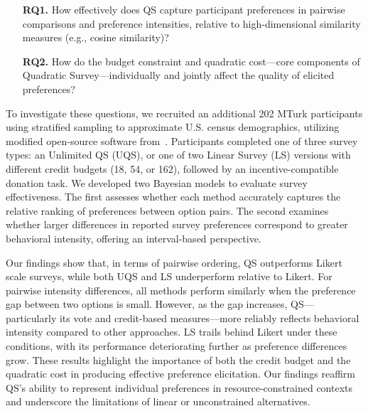 \begin{itemize}
    \item [\textbf{RQ1.}] How effectively does QS capture participant preferences in pairwise comparisons and preference intensities, relative to high-dimensional similarity measures (e.g., cosine similarity)?
    \item [\textbf{RQ2.}] How do the budget constraint and quadratic cost---core components of Quadratic Survey---individually and jointly affect the quality of elicited preferences?
\end{itemize}


To investigate these questions, we recruited an additional 202 MTurk participants using stratified sampling to approximate U.S. census demographics, utilizing modified open-source software from~\citet{chengCanShowWhat2021}. Participants completed one of three survey types: an Unlimited QS (UQS), or one of two Linear Survey (LS) versions with different credit budgets (18, 54, or 162), followed by an incentive-compatible donation task. We developed two Bayesian models to evaluate survey effectiveness. The first assesses whether each method accurately captures the relative ranking of preferences between option pairs. The second examines whether larger differences in reported survey preferences correspond to greater behavioral intensity, offering an interval-based perspective.

Our findings show that, in terms of pairwise ordering, QS outperforms Likert scale surveys, while both UQS and LS underperform relative to Likert. For pairwise intensity differences, all methods perform similarly when the preference gap between two options is small. However, as the gap increases, QS—particularly its vote and credit-based measures—more reliably reflects behavioral intensity compared to other approaches. LS trails behind Likert under these conditions, with its performance deteriorating further as preference differences grow. These results highlight the importance of both the credit budget and the quadratic cost in producing effective preference elicitation. Our findings reaffirm QS's ability to represent individual preferences in resource-constrained contexts and underscore the limitations of linear or unconstrained alternatives.


